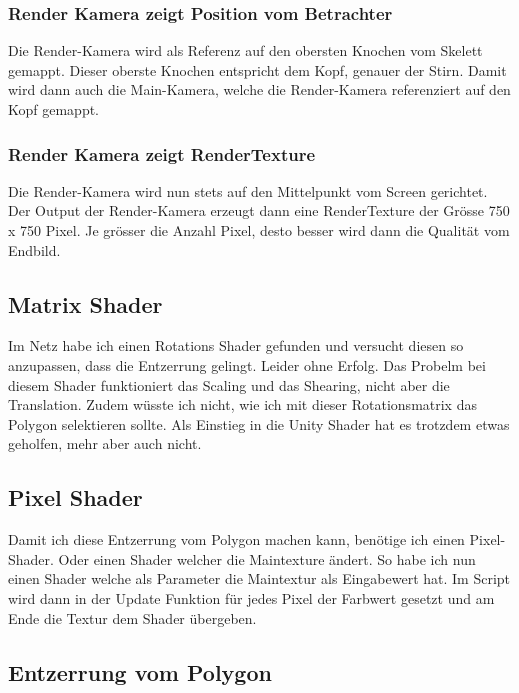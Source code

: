 \subsubsection{Render Kamera zeigt Position vom Betrachter}
Die Render-Kamera wird als Referenz auf den obersten Knochen vom Skelett gemappt. Dieser oberste Knochen entspricht dem Kopf, genauer der Stirn.
Damit wird dann auch die Main-Kamera, welche die Render-Kamera referenziert auf den Kopf gemappt.

\subsubsection{Render Kamera zeigt RenderTexture}
Die Render-Kamera wird nun stets auf den Mittelpunkt vom Screen gerichtet. Der Output der Render-Kamera erzeugt dann eine RenderTexture der Grösse 750 x 750 Pixel. Je grösser die Anzahl Pixel, desto besser wird dann die Qualität vom Endbild.

\subsection{Matrix Shader}
Im Netz habe ich einen Rotations Shader gefunden und versucht diesen so anzupassen, dass die Entzerrung gelingt. Leider ohne Erfolg. Das Probelm bei diesem Shader funktioniert das Scaling und das Shearing, nicht aber die Translation. Zudem wüsste ich nicht, wie ich mit dieser Rotationsmatrix das Polygon selektieren sollte.
Als Einstieg in die Unity Shader hat es trotzdem etwas geholfen, mehr aber auch nicht.

\subsection{Pixel Shader}
Damit ich diese Entzerrung vom Polygon machen kann, benötige ich einen Pixel-Shader. Oder einen Shader welcher die Maintexture ändert.
So habe ich nun einen Shader welche als Parameter die Maintextur als Eingabewert hat. Im Script wird dann in der Update Funktion für jedes Pixel der Farbwert gesetzt und am Ende die Textur dem Shader übergeben.

\subsection{Entzerrung vom Polygon}
